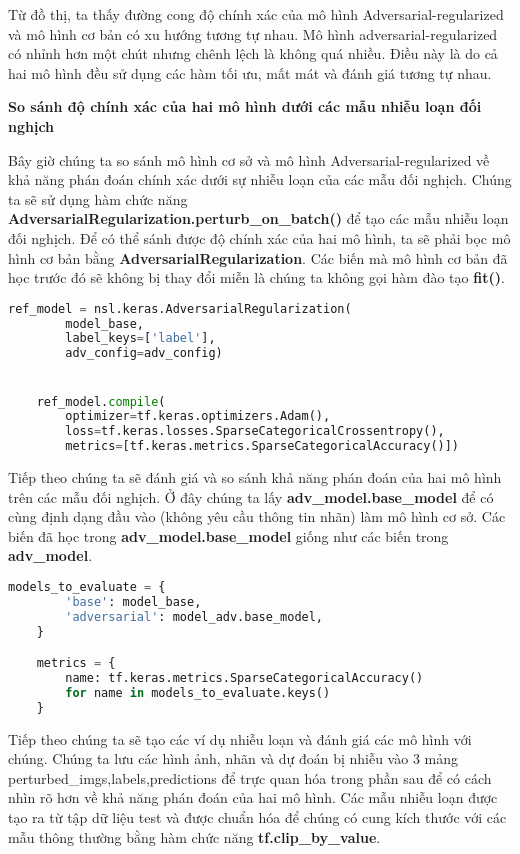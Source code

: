 Từ đồ thị, ta thấy đường cong độ chính xác của mô hình Adversarial-regularized và mô hình cơ bản có xu hướng tương tự nhau. Mô hình adversarial-regularized có nhỉnh hơn một chút nhưng chênh lệch là không quá nhiều. 
Điều này là do cả hai mô hình đều sử dụng các hàm tối ưu, mất mát và đánh giá tương tự nhau.

\textbf{So sánh độ chính xác của hai mô hình dưới các mẫu nhiễu loạn đối nghịch}

Bây giờ chúng ta so sánh mô hình cơ sở và mô hình Adversarial-regularized về khả năng phán đoán chính xác dưới sự nhiễu loạn của các mẫu đối nghịch.
Chúng ta sẽ sử dụng hàm chức năng \textbf{AdversarialRegularization.perturb\_on\_batch()} để tạo các mẫu nhiễu loạn đối nghịch. Để có thể sánh được độ chính xác của hai mô hình,
ta sẽ phải bọc mô hình cơ bản bằng \textbf{AdversarialRegularization}. Các biến mà mô hình cơ bản đã học trước đó sẽ không bị thay đổi miễn là chúng ta không gọi hàm đào tạo \textbf{fit()}.

\begin{lstlisting}[language = Python]
    ref_model = nsl.keras.AdversarialRegularization(
        model_base,
        label_keys=['label'],
        adv_config=adv_config)


    ref_model.compile(
        optimizer=tf.keras.optimizers.Adam(),
        loss=tf.keras.losses.SparseCategoricalCrossentropy(),
        metrics=[tf.keras.metrics.SparseCategoricalAccuracy()])
\end{lstlisting}

Tiếp theo chúng ta sẽ đánh giá và so sánh khả năng phán đoán của hai mô hình trên các mẫu đối nghịch.
Ở đây chúng ta lấy \textbf{adv\_model.base\_model} để có cùng định dạng đầu vào (không yêu cầu thông tin nhãn) làm mô hình cơ sở. Các biến đã học trong \textbf{adv\_model.base\_model} giống như các biến 
trong \textbf{adv\_model}.

\begin{lstlisting}[language = Python]
    models_to_evaluate = {
        'base': model_base,
        'adversarial': model_adv.base_model,
    }

    metrics = {
        name: tf.keras.metrics.SparseCategoricalAccuracy()
        for name in models_to_evaluate.keys()
    }    
\end{lstlisting}

Tiếp theo chúng ta sẽ tạo các ví dụ nhiễu loạn và đánh giá các mô hình với chúng. Chúng ta lưu các hình ảnh, nhãn và dự đoán bị nhiễu vào 3 mảng perturbed\_imgs,labels,predictions để trực 
quan hóa trong phần sau để có cách nhìn rõ hơn về khả năng phán đoán của hai mô hình. Các mẫu nhiễu loạn được tạo ra từ tập dữ liệu test và
được chuẩn hóa để chúng có cung kích thước với các mẫu thông thường bằng hàm chức năng \textbf{tf.clip\_by\_value}.


